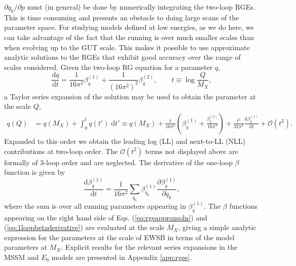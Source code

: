 \documentclass[preprint,amsmath,amssymb,aps,superscriptaddress,prd,showpacs,floatfix,nofootinbib]{revtex4-1}
\begin{document}
$\partial q_k/\partial p$ must (in general) be done by numerically
integrating the two-loop RGEs. This is time consuming and presents an
obstacle to doing large scans of the parameter space. For studying
models defined at low energies, as we do here, we can take advantage
of the fact that the running is over much smaller scales than when
evolving up to the GUT scale. This makes it possible to use
approximate analytic solutions to the RGEs that exhibit good accuracy
over the range of scales considered. Given the two-loop RG equation
for a parameter $q$,
\begin{equation}\label{eq:rge}
\frac{\textrm{d}q}{\mathrm{d}t}=\frac{1}{16\pi^2}\beta_q^{(1)}+\frac{1}{(16\pi^2)^2}\beta_q^{(2)},\qquad t\equiv \log\frac{Q}{M_X},
\end{equation}
a Taylor series expansion of the solution may be used to obtain the
parameter at the scale $Q$,
\begin{align}\label{eq:rgeapproxsoln}
q(Q)&=q(M_X)+\int_0^t q(t')\;\textrm{d}t'\approx q(M_X)+\frac{t}{16\pi^2}\left ( \beta_q^{(1)}+\frac{\beta_q^{(2)}}{16\pi^2}\right )+\frac{t^2}{32\pi^2}\frac{\textrm{d}\beta_q^{(1)}}{\textrm{d}t}+\mathcal{O}(t^2).
\end{align}
Expanded to this order we obtain the leading log (LL) and next-to-LL
(NLL) contributions at two-loop order. The $\mathcal{O}(t^2)$ terms
not displayed above are formally of 3-loop order and are
neglected. The derivative of the one-loop $\beta$ function is given by
\begin{equation}\label{eq:1loopbetaderivative}
\frac{\textrm{d}\beta_q^{(1)}}{\textrm{d}t}=\frac{1}{16\pi^2}\sum_{q_k}\beta_{q_k}^{(1)}\frac{\partial \beta_q^{(1)}}{\partial q_k},
\end{equation}
where the sum is over all running parameters appearing in
$\beta_q^{(1)}$. The $\beta$ functions appearing on the right hand
side of Eqs. (\ref{eq:rgeapproxsoln}) and
(\ref{eq:1loopbetaderivative}) are evaluated at the scale $M_X$,
giving a simple analytic expression for the parameters at the scale of
EWSB in terms of the model parameters at $M_X$. Explicit results for
the relevant series expansions in the MSSM and $E_6$ models are
presented in Appendix \ref{app:rges}.
\end{document}
